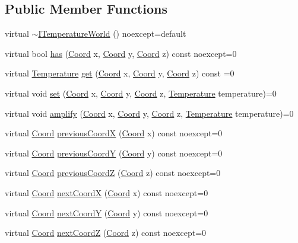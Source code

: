 \subsection*{Public Member Functions}
\begin{DoxyCompactItemize}
\item 
virtual \hyperlink{class_i_temperature_world_aa02b99dc75ef0f32db7860c208526254}{$\sim$\-I\-Temperature\-World} () noexcept=default
\item 
virtual bool \hyperlink{class_i_temperature_world_a6c498247ed71d9ad037dd0c1b4779f81}{has} (\hyperlink{struct_coord}{Coord} x, \hyperlink{struct_coord}{Coord} y, \hyperlink{struct_coord}{Coord} z) const noexcept=0
\item 
virtual \hyperlink{struct_temperature}{Temperature} \hyperlink{class_i_temperature_world_a9993df60754c2c89597bd8137568c12f}{get} (\hyperlink{struct_coord}{Coord} x, \hyperlink{struct_coord}{Coord} y, \hyperlink{struct_coord}{Coord} z) const =0
\item 
virtual void \hyperlink{class_i_temperature_world_ab23db7ec9a890d6dbb172b26c2fd3d00}{set} (\hyperlink{struct_coord}{Coord} x, \hyperlink{struct_coord}{Coord} y, \hyperlink{struct_coord}{Coord} z, \hyperlink{struct_temperature}{Temperature} temperature)=0
\item 
virtual void \hyperlink{class_i_temperature_world_ac5a8a92e7141b2e2c2e3d66ba73b7c1e}{amplify} (\hyperlink{struct_coord}{Coord} x, \hyperlink{struct_coord}{Coord} y, \hyperlink{struct_coord}{Coord} z, \hyperlink{struct_temperature}{Temperature} temperature)=0
\item 
virtual \hyperlink{struct_coord}{Coord} \hyperlink{class_i_temperature_world_adfa6f4c698d6407000314d9d43fe6c5d}{previous\-Coord\-X} (\hyperlink{struct_coord}{Coord} x) const noexcept=0
\item 
virtual \hyperlink{struct_coord}{Coord} \hyperlink{class_i_temperature_world_ab74e8cf0b0261ee342e356c1212ff9a2}{previous\-Coord\-Y} (\hyperlink{struct_coord}{Coord} y) const noexcept=0
\item 
virtual \hyperlink{struct_coord}{Coord} \hyperlink{class_i_temperature_world_a7ed125d1e71c39dc06cbe64ba58662c5}{previous\-Coord\-Z} (\hyperlink{struct_coord}{Coord} z) const noexcept=0
\item 
virtual \hyperlink{struct_coord}{Coord} \hyperlink{class_i_temperature_world_ae1daa3e639084e2c25d78ba1c9841353}{next\-Coord\-X} (\hyperlink{struct_coord}{Coord} x) const noexcept=0
\item 
virtual \hyperlink{struct_coord}{Coord} \hyperlink{class_i_temperature_world_a4c56188c251aee5dc5edea440ad288b5}{next\-Coord\-Y} (\hyperlink{struct_coord}{Coord} y) const noexcept=0
\item 
virtual \hyperlink{struct_coord}{Coord} \hyperlink{class_i_temperature_world_aeea34ba0bf416143309a0cf046ad1dce}{next\-Coord\-Z} (\hyperlink{struct_coord}{Coord} z) const noexcept=0
\end{DoxyCompactItemize}



